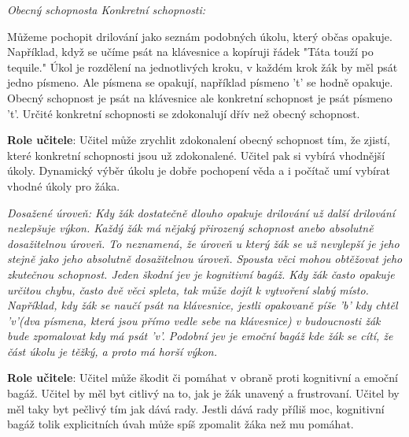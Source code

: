 \em Obecný schopnost\em a \em Konkretní schopnosti\em :

Můžeme pochopit drilování jako seznám podobných úkolu, který občas opakuje.  Například, když se učíme psát na klávesnice a kopíruji řádek "Táta touží po tequile." Úkol je rozdělení na jednotlivých kroku, v každém krok žák by měl psát jedno písmeno.  Ale písmena se opakují, například písmeno 't' se hodně opakuje.  Obecný schopnost je psát na klávesnice ale konkretní schopnost je psát písmeno 't'. Určité konkretní schopnosti se zdokonalují dřív než obecný schopnost.

{\bf Role učitele}: Učitel může zrychlit zdokonalení obecný schopnost tím, že zjistí, které konkretní schopnosti jsou už zdokonalené.  Učitel pak si vybírá vhodnější úkoly.  Dynamický výběr úkolu je dobře pochopení věda\citep{hintzman1976repetition} a i počítač umí vybírat vhodné úkoly pro žáka\citep{anki}.

\em Dosažené úroveň\em : Kdy žák dostatečně dlouho opakuje drilování už další drilování nezlepšuje výkon.  Každý žák má nějaký přirozený schopnost anebo absolutně dosažitelnou úroveň.  To neznamená, že úroveň u který žák se už nevylepší je jeho stejně jako jeho absolutně dosažitelnou úroveň.  Spousta věci mohou obtěžovat jeho zkutečnou schopnost.  Jeden škodní jev je kognitivní bagáž. Kdy žák často opakuje určitou chybu, často dvě věci spleta, tak může dojít k vytvoření slabý místo. Například, kdy žák se naučí psát na klávesnice, jestli opakovaně píše 'b' kdy chtěl 'v'(dva písmena, která jsou přímo vedle sebe na klávesnice) v budoucnosti žák bude zpomalovat kdy má psát 'v'. Podobní jev je emoční bagáž kde žák se cítí, že část úkolu je těžký, a proto má horší výkon.

{\bf Role učitele}: Učitel může škodit či pomáhat v obraně proti kognitivní a emoční bagáž.  Učitel by měl byt citlivý na to, jak je žák unavený a frustrovaní. Učitel by měl taky byt pečlivý tím jak dává rady.  Jestli dává rady příliš moc, kognitivní bagáž tolik explicitních úvah může spíš zpomalit žáka než mu pomáhat.
